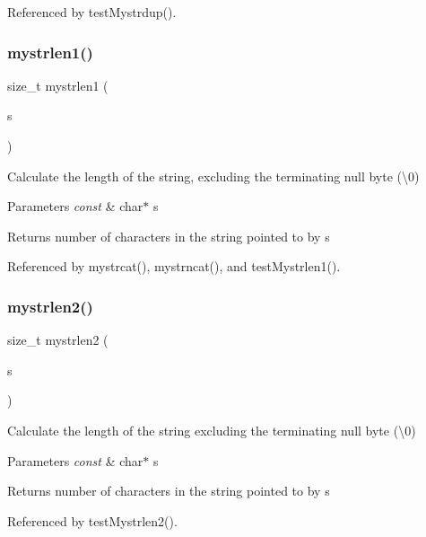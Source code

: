 Referenced by test\+Mystrdup().

\mbox{\label{mystring_8c_a71f9f1095f41990d202157923cfe578a}} 
\subsubsection{mystrlen1()}
{\footnotesize\ttfamily size\+\_\+t mystrlen1 (\begin{DoxyParamCaption}\item[{const char $\ast$}]{s }\end{DoxyParamCaption})}

Calculate the length of the string, excluding the terminating null byte (\textquotesingle{}\textbackslash{}0\textquotesingle{}) 
\begin{DoxyParams}{Parameters}
{\em const} & char$\ast$ s \\
\hline
\end{DoxyParams}
\begin{DoxyReturn}{Returns}
number of characters in the string pointed to by s 
\end{DoxyReturn}


Referenced by mystrcat(), mystrncat(), and test\+Mystrlen1().

\mbox{\label{mystring_8c_a0553e98c4213b02262ce36a73cc9b088}} 
\subsubsection{mystrlen2()}
{\footnotesize\ttfamily size\+\_\+t mystrlen2 (\begin{DoxyParamCaption}\item[{const char $\ast$}]{s }\end{DoxyParamCaption})}

Calculate the length of the string excluding the terminating null byte (\textquotesingle{}\textbackslash{}0\textquotesingle{}) 
\begin{DoxyParams}{Parameters}
{\em const} & char$\ast$ s \\
\hline
\end{DoxyParams}
\begin{DoxyReturn}{Returns}
number of characters in the string pointed to by s 
\end{DoxyReturn}


Referenced by test\+Mystrlen2().

